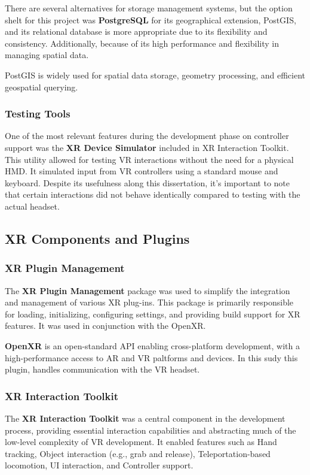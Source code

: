 There are several alternatives for storage management systems, but the option shelt for this project was \textbf{PostgreSQL} for its geographical extension, PostGIS, and its relational database is more appropriate due to its flexibility and consistency.
Additionally, because of its high performance and flexibility in managing spatial data. 

PostGIS is widely used for spatial data storage, geometry processing, and efficient geospatial querying.

\subsubsection{Testing Tools}

One of the most relevant features during the development phase on controller support was the \textbf{XR Device Simulator} included in XR Interaction Toolkit. 
This utility allowed for testing \gls{VR} interactions without the need for a physical \gls{HMD}. 
It simulated input from \gls{VR} controllers using a standard mouse and keyboard. 
Despite its usefulness along this dissertation, it's important to note that certain interactions did not behave identically compared to testing with the actual headset.


\subsection{XR Components and Plugins}
\subsubsection{XR Plugin Management}
The \textbf{XR Plugin Management} package was used to simplify the integration and management of various XR plug-ins. 
This package is primarily responsible for loading, initializing, configuring settings, and providing build support for XR features. 
It was used in conjunction with the OpenXR.

\textbf{OpenXR} is an open-standard \gls{API} enabling cross-platform development, with a high-performance access to AR and VR paltforms and devices. In this sudy this plugin, handles communication with the \gls{VR} headset.

\subsubsection{XR Interaction Toolkit}
The \textbf{XR Interaction Toolkit} was a central component in the development process, providing essential interaction capabilities and abstracting much of the low-level complexity of \gls{VR} development. It enabled features such as Hand tracking, 
Object interaction (e.g., grab and release), Teleportation-based locomotion, \gls{UI} interaction, and Controller support.

